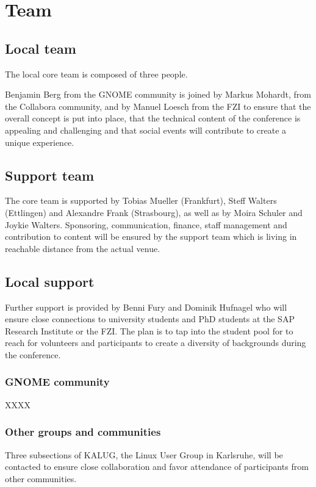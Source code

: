 
\section{Team}

\subsection{Local team}
The local core team is composed of three people.

Benjamin Berg from the GNOME community is joined by Markus Mohardt, from the Collabora community, and by Manuel Loesch from the FZI to ensure that the overall concept is put into place, that the technical content of the conference is appealing and challenging and that social events will contribute to create a unique experience.

\subsection{Support team}

The core team is supported by Tobias Mueller (Frankfurt), Steff Walters (Ettlingen) and Alexandre Frank (Strasbourg), as well as by Moira Schuler and Joykie Walters. Sponsoring, communication, finance, staff management and contribution to content will be ensured by the support team which is living in reachable distance from the actual venue. 

\subsection{Local support}

Further support is provided by Benni Fury and Dominik Hufnagel who will ensure close connections to university students and PhD students at the SAP Research Institute or the FZI. The plan is to tap into the student pool for to reach for volunteers and participants to create a diversity of backgrounds during the conference. 

\subsubsection{GNOME community}

XXXX


\subsubsection{Other groups and communities}

Three subsections of KALUG, the Linux User Group in Karlsruhe, will be contacted to ensure close collaboration and favor attendance of participants from other communities. 

